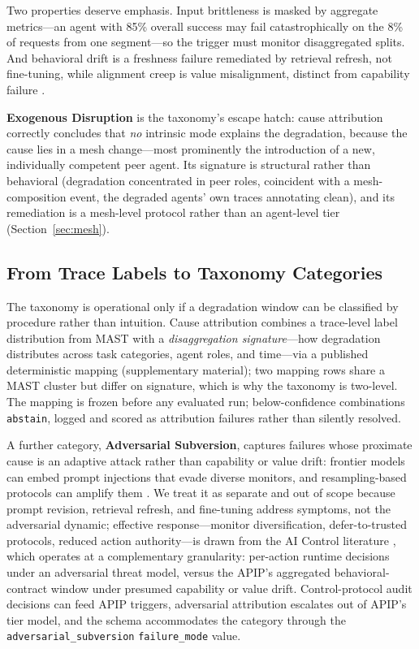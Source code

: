 \documentclass[conference]{IEEEtran}
\newcommand{\code}[1]{\texttt{\small #1}}
\begin{document}
Two properties deserve emphasis. Input brittleness is masked by aggregate
metrics---an agent with 85\% overall success may fail catastrophically on the
8\% of requests from one segment---so the trigger must monitor disaggregated
splits. And behavioral drift is a freshness failure remediated by retrieval
refresh, not fine-tuning, while alignment creep is value misalignment, distinct
from capability failure \cite{hendrycks2021}.

\textbf{Exogenous Disruption} is the taxonomy's escape hatch: cause attribution
correctly concludes that \emph{no} intrinsic mode explains the degradation,
because the cause lies in a mesh change---most prominently the introduction of a
new, individually competent peer agent. Its signature is structural rather than
behavioral (degradation concentrated in peer roles, coincident with a
mesh-composition event, the degraded agents' own traces annotating clean), and
its remediation is a mesh-level protocol rather than an agent-level tier
(Section~\ref{sec:mesh}).

\subsection{From Trace Labels to Taxonomy Categories}
\label{sec:mapping}

The taxonomy is operational only if a degradation window can be classified by
procedure rather than intuition. Cause attribution combines a trace-level label
distribution from MAST \cite{cemri2025} with a \emph{disaggregation
signature}---how degradation distributes across task categories, agent roles,
and time---via a published deterministic mapping (supplementary material); two
mapping rows share a MAST cluster but differ on signature, which is why the
taxonomy is two-level. The mapping is frozen before any evaluated run;
below-confidence combinations \code{abstain}, logged and scored as attribution
failures rather than silently resolved.

A further category, \textbf{Adversarial Subversion}, captures failures whose
proximate cause is an adaptive attack rather than capability or value drift:
frontier models can embed prompt injections that evade diverse monitors, and
resampling-based protocols can amplify them \cite{bhatt2025, schoen2025}. We
treat it as separate and out of scope because prompt revision, retrieval
refresh, and fine-tuning address symptoms, not the adversarial dynamic;
effective response---monitor diversification, defer-to-trusted protocols,
reduced action authority---is drawn from the AI Control literature
\cite{greenblatt2023}, which operates at a complementary granularity:
per-action runtime decisions under an adversarial threat model, versus the
APIP's aggregated behavioral-contract window under presumed capability or value
drift. Control-protocol audit decisions can feed APIP triggers, adversarial
attribution escalates out of APIP's tier model, and the schema accommodates the
category through the \code{adversarial\_subversion} \code{failure\_mode} value.
\end{document}
